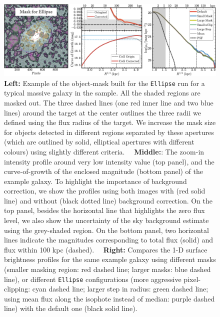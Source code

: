 \documentclass[fleqn,usenatbib]{mnras}
\begin{document}
    \begin{figure}
        \centering 
        \includegraphics[width=\textwidth]{fig/redbcg_ellipse_tech}
        \caption{
            \textbf{Left:} Example of the object-mask built for the \texttt{Ellipse}
            run for a typical massive galaxy in the sample. 
            All the shaded regions are masked out. 
            The three dashed lines (one red inner line and two blue lines) around 
            the target at the center outlines the three radii we defined using the 
            flux radius of the target.  
            We increase the mask size for objects detected in different regions 
            separated by these apertures (which are outlined by solid, elliptical 
            apertures with different colours) using slightly different criteria.~~
            \textbf{Middle:}: The zoom-in intensity profile around very low intensity 
            value (top panel), and the curve-of-growth of the enclosed magnitude 
            (bottom panel) of the example galaxy.  
            To highlight the importance of background correction, we show the profiles 
            using both images with (red solid line) and without (black dotted line) 
            background correction. 
            On the top panel, besides the horizontal line that highlights the zero flux 
            level, we also show the uncertainty of the sky background estimate using 
            the grey-shaded region.  
            On the bottom panel, two horizontal lines indicate the magnitudes 
            corresponding to total flux (solid) and flux within 100 kpc (dashed).~~
            \textbf{Right:} Compares the 1-D surface brightness profiles for the same 
            example galaxy using different masks 
            (smaller masking region: red dashed line; larger masks: blue dashed line), 
            or different \texttt{Ellipse} configurations
            (more aggressive pixel-clipping: cyan dashed line; 
            larger step in radius: green dashed line; 
            using mean flux along the isophote instead of median: purple dashed line)
            with the default one (black solid line).
            }
        \label{fig:ell_tech}
    \end{figure}
\end{document}

